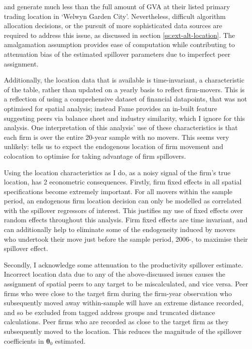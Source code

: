and generate much less than the full amount of GVA
at their listed primary trading location in `Welwyn Garden City'.
Nevertheless, difficult algorithm allocation decisions,
or the pursuit of more sophisticated data sources
are required to address this issue,
as discussed in section \ref{ss:ext-alt-location}.
The amalgamation assumption provides ease of computation 
while contributing to attenuation bias of the estimated spillover parameters
due to imperfect peer assignment.
\par
Additionally, the location data that is available is time-invariant,
a characteristic of the  table, rather than updated on a yearly basis
to reflect firm-movers.
This is a reflection of using a comprehensive dataset of financial datapoints,
that was not optimised for spatial analysis; instead Fame provides an in-built feature
suggesting peers via balance sheet and industry similarity, which I ignore for this analysis.
One interpretation of this analysis' use of these characteristics
is that each firm is over the entire 20-year sample with no movers.
This seems very unlikely:  tells us to expect
the endogenous location of firm movement and colocation
to optimise for taking advantage of firm spillovers.
\par
Using the location characteristics as I do,
as a noisy signal of the firm's true location, has 2 econometric consequences.
Firstly, firm fixed effects in all spatial specifications become extremely important.
For all movers within the sample period, an endogenous firm location decision
can only be modelled as correlated with the spillover regressors of interest.
This justifies my use of fixed effects over random effects throughout this analysis.
Firm fixed effects are time invariant, and can additionally help to eliminate
some of the endogeneity induced by movers who undertook their move
just before the sample period, 2006-, to maximise their spillover effect.
\par
Secondly, I acknowledge some attenuation to the productivity spillover estimate.
Incorrect location data due to any of the above-discussed issues
causes the assignment of spatial peers to any target to be miscalculated,
and vice versa.
Peer firms who were close to the target firm during the firm-year observation
who subsequently moved away within-sample will have an extreme distance recorded,
and so be excluded from tagged address groups and truncated distance calculations.
Peer firms who are recorded as close to the target firm as they subsequently moved to the location.
This reduces the magnitude of the spillover coefficients in $\boldsymbol \theta_0$ estimated.


